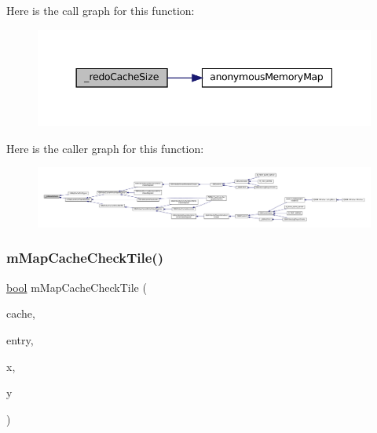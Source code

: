Here is the call graph for this function\+:
\nopagebreak
\begin{figure}[H]
\begin{center}
\leavevmode
\includegraphics[width=344pt]{map-cache_8c_ab08e2be4f74e6da3a5ec9ef9e0c5a040_cgraph}
\end{center}
\end{figure}
Here is the caller graph for this function\+:
\nopagebreak
\begin{figure}[H]
\begin{center}
\leavevmode
\includegraphics[width=350pt]{map-cache_8c_ab08e2be4f74e6da3a5ec9ef9e0c5a040_icgraph}
\end{center}
\end{figure}
\mbox{\label{map-cache_8c_a15867a8857e1045680838b22ad9ccc61}} 
\subsubsection{\texorpdfstring{m\+Map\+Cache\+Check\+Tile()}{mMapCacheCheckTile()}}
{\footnotesize\ttfamily \mbox{\hyperlink{libretro_8h_a4a26dcae73fb7e1528214a068aca317e}{bool}} m\+Map\+Cache\+Check\+Tile (\begin{DoxyParamCaption}\item[{struct m\+Map\+Cache $\ast$}]{cache,  }\item[{const struct m\+Map\+Cache\+Entry $\ast$}]{entry,  }\item[{unsigned}]{x,  }\item[{unsigned}]{y }\end{DoxyParamCaption})}

